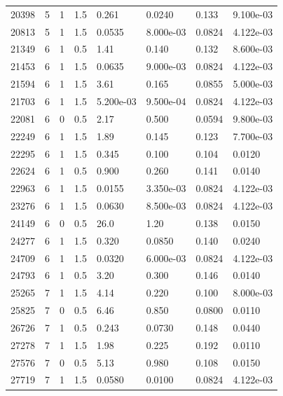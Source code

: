 \documentclass[preview]{standalone}
\begin{document}
{{{\begin{tabular}{L{1.2cm}C{1.2cm} C{0.3cm}C{0.5cm} C{1.4cm}C{1.4cm} C{1.4cm}C{1.4cm}}
  20398  &     5  & 1     & 1.5 &  0.261  & 0.0240  & 0.133 &  9.100e-03   \\ 
  20813  &     5  & 1     & 1.5 &  0.0535  & 8.000e-03  & 0.0824 &  4.122e-03   \\ 
  21349  &     6  & 1     & 0.5 &  1.41  & 0.140  & 0.132 &  8.600e-03   \\ 
  21453  &     6  & 1     & 1.5 &  0.0635  & 9.000e-03  & 0.0824 &  4.122e-03   \\ 
  21594  &     6  & 1     & 1.5 &  3.61  & 0.165  & 0.0855 &  5.000e-03   \\ 
  21703  &     6  & 1     & 1.5 &  5.200e-03  & 9.500e-04  & 0.0824 &  4.122e-03   \\ 
  22081  &     6  & 0     & 0.5 &  2.17  & 0.500  & 0.0594 &  9.800e-03   \\ 
  22249  &     6  & 1     & 1.5 &  1.89  & 0.145  & 0.123 &  7.700e-03   \\ 
  22295  &     6  & 1     & 1.5 &  0.345  & 0.100  & 0.104 &  0.0120   \\ 
  22624  &     6  & 1     & 0.5 &  0.900  & 0.260  & 0.141 &  0.0140   \\ 
  22963  &     6  & 1     & 1.5 &  0.0155  & 3.350e-03  & 0.0824 &  4.122e-03   \\ 
  23276  &     6  & 1     & 1.5 &  0.0630  & 8.500e-03  & 0.0824 &  4.122e-03   \\ 
  24149  &     6  & 0     & 0.5 &  26.0  & 1.20  & 0.138 &  0.0150   \\ 
  24277  &     6  & 1     & 1.5 &  0.320  & 0.0850  & 0.140 &  0.0240   \\ 
  24709  &     6  & 1     & 1.5 &  0.0320  & 6.000e-03  & 0.0824 &  4.122e-03   \\ 
  24793  &     6  & 1     & 0.5 &  3.20  & 0.300  & 0.146 &  0.0140   \\ 
  25265  &     7  & 1     & 1.5 &  4.14  & 0.220  & 0.100 &  8.000e-03   \\ 
  25825  &     7  & 0     & 0.5 &  6.46  & 0.850  & 0.0800 &  0.0110   \\ 
  26726  &     7  & 1     & 0.5 &  0.243  & 0.0730  & 0.148 &  0.0440   \\ 
  27278  &     7  & 1     & 1.5 &  1.98  & 0.225  & 0.192 &  0.0110   \\ 
  27576  &     7  & 0     & 0.5 &  5.13  & 0.980  & 0.108 &  0.0150   \\ 
  27719  &     7  & 1     & 1.5 &  0.0580  & 0.0100  & 0.0824 &  4.122e-03   \\ 

\end{tabular}}}}
\end{document}
